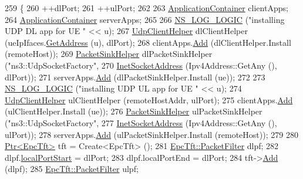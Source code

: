 \begin{DoxyCode}
259         \{
260           ++dlPort;
261           ++ulPort;
262 
263           \hyperlink{classns3_1_1ApplicationContainer}{ApplicationContainer} clientApps;
264           \hyperlink{classns3_1_1ApplicationContainer}{ApplicationContainer} serverApps;
265 
266           \hyperlink{group__logging_ga88acd260151caf2db9c0fc84997f45ce}{NS\_LOG\_LOGIC} (\textcolor{stringliteral}{"installing UDP DL app for UE "} << u);
267           \hyperlink{classns3_1_1UdpClientHelper}{UdpClientHelper} dlClientHelper (ueIpIfaces.\hyperlink{classns3_1_1Ipv4InterfaceContainer_ae63208dcd222be986822937ee4aa828c}{GetAddress} (u), dlPort);
268           clientApps.\hyperlink{classns3_1_1ApplicationContainer_ad09ab1a1ad5849d518d5f4c262e38152}{Add} (dlClientHelper.Install (remoteHost));
269           \hyperlink{classns3_1_1PacketSinkHelper}{PacketSinkHelper} dlPacketSinkHelper (\textcolor{stringliteral}{"ns3::UdpSocketFactory"},
270                                                \hyperlink{classns3_1_1InetSocketAddress}{InetSocketAddress} (Ipv4Address::GetAny (), 
      dlPort));
271           serverApps.\hyperlink{classns3_1_1ApplicationContainer_ad09ab1a1ad5849d518d5f4c262e38152}{Add} (dlPacketSinkHelper.Install (ue));
272 
273           \hyperlink{group__logging_ga88acd260151caf2db9c0fc84997f45ce}{NS\_LOG\_LOGIC} (\textcolor{stringliteral}{"installing UDP UL app for UE "} << u);
274           \hyperlink{classns3_1_1UdpClientHelper}{UdpClientHelper} ulClientHelper (remoteHostAddr, ulPort);
275           clientApps.\hyperlink{classns3_1_1ApplicationContainer_ad09ab1a1ad5849d518d5f4c262e38152}{Add} (ulClientHelper.Install (ue));
276           \hyperlink{classns3_1_1PacketSinkHelper}{PacketSinkHelper} ulPacketSinkHelper (\textcolor{stringliteral}{"ns3::UdpSocketFactory"},
277                                                \hyperlink{classns3_1_1InetSocketAddress}{InetSocketAddress} (Ipv4Address::GetAny (), 
      ulPort));
278           serverApps.\hyperlink{classns3_1_1ApplicationContainer_ad09ab1a1ad5849d518d5f4c262e38152}{Add} (ulPacketSinkHelper.Install (remoteHost));
279 
280           \hyperlink{classns3_1_1Ptr}{Ptr<EpcTft>} tft = Create<EpcTft> ();
281           \hyperlink{structns3_1_1EpcTft_1_1PacketFilter}{EpcTft::PacketFilter} dlpf;
282           dlpf.\hyperlink{structns3_1_1EpcTft_1_1PacketFilter_afd505cda437b1687abc4432a8bcefbaf}{localPortStart} = dlPort;
283           dlpf.localPortEnd = dlPort;
284           tft->\hyperlink{classns3_1_1EpcTft_a1228456a8abbe48cbc89bbe2d2e9af48}{Add} (dlpf);
285           \hyperlink{structns3_1_1EpcTft_1_1PacketFilter}{EpcTft::PacketFilter} ulpf;

\end{DoxyCode}
